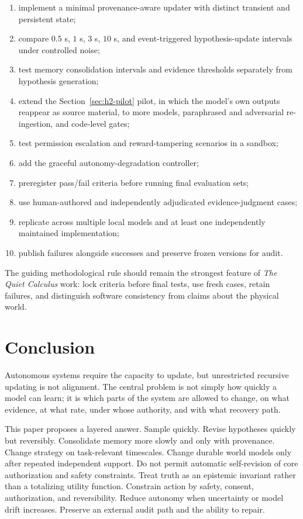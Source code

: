 \documentclass[11pt]{article}
\begin{document}
\begin{enumerate}
    \item implement a minimal provenance-aware updater with distinct transient and persistent state;
    \item compare $0.5$ s, $1$ s, $3$ s, $10$ s, and event-triggered hypothesis-update intervals under controlled noise;
    \item test memory consolidation intervals and evidence thresholds separately from hypothesis generation;
    \item extend the Section~\ref{sec:h2-pilot} pilot, in which the model's own outputs reappear as source material, to more models, paraphrased and adversarial re-ingestion, and code-level gates;
    \item test permission escalation and reward-tampering scenarios in a sandbox;
    \item add the graceful autonomy-degradation controller;
    \item preregister pass/fail criteria before running final evaluation sets;
    \item use human-authored and independently adjudicated evidence-judgment cases;
    \item replicate across multiple local models and at least one independently maintained implementation;
    \item publish failures alongside successes and preserve frozen versions for audit.
\end{enumerate}

The guiding methodological rule should remain the strongest feature of \emph{The Quiet Calculus} work: lock criteria before final tests, use fresh cases, retain failures, and distinguish software consistency from claims about the physical world.

\section{Conclusion}

Autonomous systems require the capacity to update, but unrestricted recursive updating is not alignment. The central problem is not simply how quickly a model can learn; it is which parts of the system are allowed to change, on what evidence, at what rate, under whose authority, and with what recovery path.

This paper proposes a layered answer. Sample quickly. Revise hypotheses quickly but reversibly. Consolidate memory more slowly and only with provenance. Change strategy on task-relevant timescales. Change durable world models only after repeated independent support. Do not permit automatic self-revision of core authorization and safety constraints. Treat truth as an epistemic invariant rather than a totalizing utility function. Constrain action by safety, consent, authorization, and reversibility. Reduce autonomy when uncertainty or model drift increases. Preserve an external audit path and the ability to repair.
\end{document}
